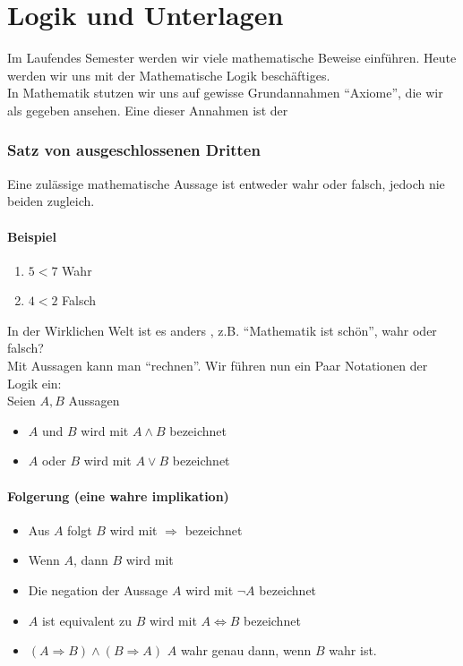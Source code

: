 \chapter{Logik und Unterlagen}
Im Laufendes Semester werden wir viele mathematische Beweise einführen. Heute werden wir uns mit der Mathematische Logik beschäftiges.\\

In Mathematik stutzen wir uns auf gewisse Grundannahmen ``Axiome'', die wir als gegeben ansehen. Eine dieser Annahmen ist der 
\subsection*{Satz von ausgeschlossenen Dritten}
Eine zulässige mathematische Aussage ist entweder wahr oder falsch, jedoch nie beiden zugleich.
\subsubsection*{Beispiel}
\begin{enumerate}
	\item $5<7$ Wahr
	\item $4<2$ Falsch
\end{enumerate}
In der Wirklichen Welt ist es anders , z.B. ``Mathematik ist schön'', wahr oder falsch?\\

Mit Aussagen kann man ``rechnen''. Wir führen nun ein Paar  Notationen der Logik ein:\\
Seien $A,B$ Aussagen
\begin{itemize}
\item $A$ und $B$ wird mit $A\land B$ bezeichnet
\item $A$ oder $B$ wird mit $A\lor B$ bezeichnet
\end{itemize}
\subsubsection*{Folgerung (eine wahre implikation)}
\begin{itemize}
\item Aus $A$ folgt $B$ wird mit $\Rightarrow$ bezeichnet
\item Wenn $A$, dann $B$ wird mit 
\item Die negation der Aussage $A$ wird mit $\lnot A$ bezeichnet
\item $A$ ist equivalent zu $B$ wird mit $A\Leftrightarrow B$ bezeichnet
\item $\left(A\Rightarrow B\right)\land \left( B\Rightarrow A\right)$ $A$ wahr genau dann, wenn $B$ wahr ist.
\end{itemize}

